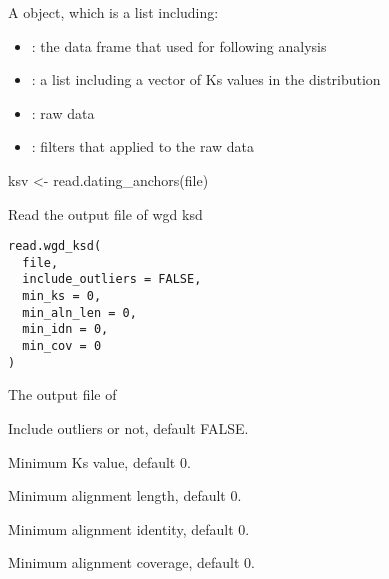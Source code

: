 \documentclass[a4paper]{book}
\begin{document}
%
\begin{Value}
A  object, which is a list including:
\begin{itemize}

\item{} : the data frame that used for following analysis
\item{} : a list including a vector of Ks values in the distribution
\item{} : raw data
\item{} : filters that applied to the raw data

\end{itemize}

\end{Value}
%
\begin{SeeAlso}\relax
{}
\end{SeeAlso}
%
\begin{Examples}
\begin{ExampleCode}
ksv <- read.dating_anchors(file)
\end{ExampleCode}
\end{Examples}
%
\begin{Description}\relax
Read the output file of wgd ksd
\end{Description}
%
\begin{Usage}
\begin{verbatim}
read.wgd_ksd(
  file,
  include_outliers = FALSE,
  min_ks = 0,
  min_aln_len = 0,
  min_idn = 0,
  min_cov = 0
)
\end{verbatim}
\end{Usage}
%
\begin{Arguments}
\begin{ldescription}
\item[\code{file}] The output file of 

\item[\code{include\_outliers}] Include outliers or not, default FALSE.

\item[\code{min\_ks}] Minimum Ks value, default 0.

\item[\code{min\_aln\_len}] Minimum alignment length, default 0.

\item[\code{min\_idn}] Minimum alignment identity, default 0.

\item[\code{min\_cov}] Minimum alignment coverage, default 0.
\end{ldescription}
\end{Arguments}
\end{document}
